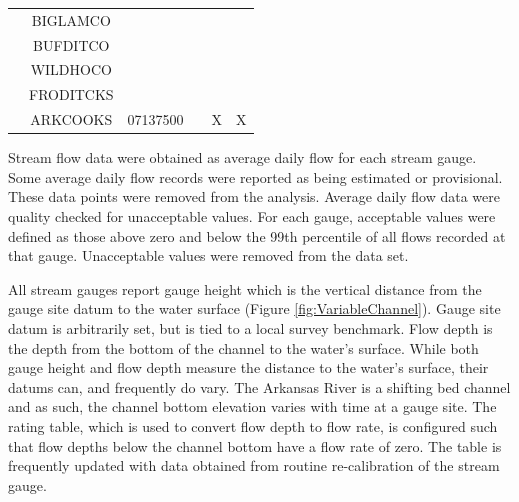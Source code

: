 \begin{linenumbers}
\begin{table}[htbp]
\begin{tabular}{cccccc}
  	                      & BIGLAMCO  &                         &           &             &  \\
  	                      & BUFDITCO  &                         &           &             &  \\
  	                      & WILDHOCO  &                         &           &             &  \\
  	                      & FRODITCKS &                         &           &             &  \\
  	                      & ARKCOOKS  &        07137500         &           &      X      &  X  \\ \bottomrule
  \end{tabular}
\end{table}

Stream flow data were obtained as average daily flow for each stream gauge. Some average daily flow records were reported as being estimated or provisional.  These data points were removed from the analysis.  Average daily flow data were quality checked for unacceptable values.  For each gauge, acceptable values were defined as those above zero and below the 99th percentile of all flows recorded at that gauge.  Unacceptable values were removed from the data set.

All stream gauges report gauge height which is the vertical distance from the gauge site datum to the water surface (Figure \ref{fig:VariableChannel}).  Gauge site datum is arbitrarily set, but is tied to a local survey benchmark.  Flow depth is the depth from the bottom of the channel to the water's surface.  While both gauge height and flow depth measure the distance to the water's surface, their datums can, and frequently do vary.  The Arkansas River is a shifting bed channel and as such, the channel bottom elevation varies with time at a gauge site.  The rating table, which is used to convert flow depth to flow rate, is configured such that flow depths below the channel bottom have a flow rate of zero.  The table is frequently updated with data obtained from routine re-calibration of the stream gauge.


\end{linenumbers}
